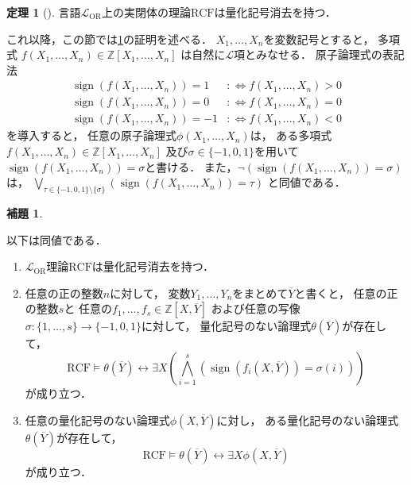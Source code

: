 \documentclass[uplatex, dvipdfmx]{jsarticle}
\numberwithin{equation}{section}
\newcommand{\Z}{\mathbb{Z}}
\newcommand{\defiff}{ :\Leftrightarrow}
\newcommand{\RCF}{\mathrm{RCF}}
\newcommand{\map}[3]{{#1}\colon{#2}\rightarrow{#3}}
\DeclareMathOperator{\sign}{sign}
\theoremstyle{definition}
\newtheorem{lemma}[definition]{補題}
\newtheorem{theorem}[definition]{定理}
\begin{document}
\begin{theorem}[{\cite[Theorem 11]{MR0044472}}]\label{theorem:Tarski}
     言語$\mathcal{L}_\mathrm{OR}$上の実閉体の理論$\RCF$は量化記号消去を持つ．
\end{theorem}

これ以降，この節では\cref{theorem:Tarski}の証明を述べる．
$X_1, \dots, X_n$を変数記号とすると，
多項式
$
f(X_1, \dots, X_n) \in \Z[X_1, \dots, X_n]
$
は自然に$\mathcal{L}$項とみなせる．
原子論理式の表記法
\begin{align}
     \sign (f(X_1, \dots, X_n)) = 1 & \defiff f(X_1, \dots, X_n) > 0\\
     \sign (f(X_1, \dots, X_n)) = 0 & \defiff f(X_1, \dots, X_n) = 0\\
     \sign (f(X_1, \dots, X_n)) = -1 & \defiff f(X_1, \dots, X_n) < 0
\end{align}
を導入すると，
任意の原子論理式$\phi(X_1, \dots, X_n)$は，
ある多項式$f(X_1,\dots,X_n) \in \Z[X_1, \dots, X_n]$
及び$\sigma \in \{-1, 0, 1\}$を用いて
$\sign(f(X_1, \dots, X_n)) = \sigma$と書ける．
また，$\lnot(\sign(f(X_1, \dots, X_n)) = \sigma)$は，
$\bigvee_{\tau \in \{-1,0,1\} \setminus \{\sigma\}} (\sign(f(X_1, \dots, X_n)) = \tau)$
と同値である．

\begin{lemma}\label{lemma:qe_simplify}
     
     以下は同値である．
     \begin{enumerate}
          \item \label{lemma:qe_simplify_1}
          $\mathcal{L}_\mathrm{OR}$理論$\RCF$は量化記号消去を持つ．
          \item \label{lemma:qe_simplify_2}
          任意の正の整数$n$に対して，
          変数$Y_1, \dots, Y_n$をまとめて$\overline{Y}$と書くと，
          任意の正の整数$s$と
          任意の$f_1, \dots, f_s \in \Z \left[X, \overline{Y}\right]$
          および任意の写像$\map{\sigma}{\{1, \dots, s\}}{\{-1,0,1\}}$に対して，
          量化記号のない論理式$\theta\left(\overline{Y}\right)$が存在して，
          \begin{equation}
               \RCF \models \theta\left(\overline{Y}\right) \leftrightarrow \exists X \left(\bigwedge_{i=1}^s \left(\sign\left(f_i\left(X,\overline{Y}\right)\right) = \sigma(i)\right)\right)
          \end{equation}
          が成り立つ．
          \item \label{lemma:qe_simplify_3}
          任意の量化記号のない論理式$\phi\left(X, \overline{Y}\right)$に対し，
          ある量化記号のない論理式$\theta\left(\overline{Y}\right)$が存在して，
          \begin{equation}
               \RCF \models \theta\left(\overline{Y}\right) \leftrightarrow \exists X \phi\left(X, \overline{Y}\right)
          \end{equation}
          が成り立つ．
     \end{enumerate}
\end{lemma}
\end{document}
